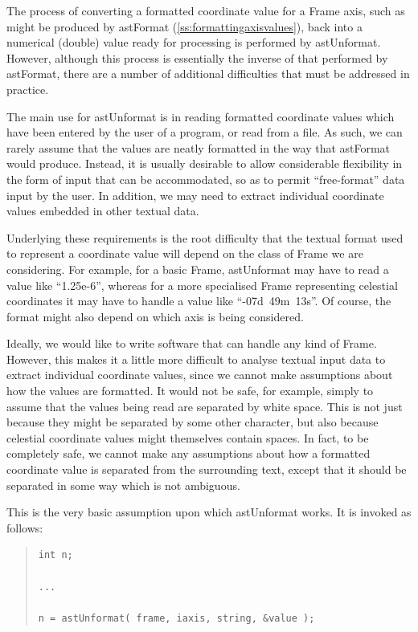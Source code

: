 \documentclass[twoside,11pt]{article}
\newcommand{\htmlref}[2]{#1}
\newcommand{\secref}[1]{\S\ref{#1}}
\renewcommand{\secref}[1]{\ref{#1}}
\begin{document}
The process of converting a formatted coordinate value for a \htmlref{Frame}{Frame}
axis, such as might be produced by \htmlref{astFormat}{astFormat}
(\secref{ss:formattingaxisvalues}), back into a numerical (double)
value ready for processing is performed by \htmlref{astUnformat}{astUnformat}.  However,
although this process is essentially the inverse of that performed by
astFormat, there are a number of additional difficulties that must be
addressed in practice.

The main use for astUnformat is in reading formatted coordinate values
which have been entered by the user of a program, or read from a
file. As such, we can rarely assume that the values are neatly
formatted in the way that astFormat would produce. Instead, it is
usually desirable to allow considerable flexibility in the form of
input that can be accommodated, so as to permit ``free-format'' data
input by the user. In addition, we may need to extract individual
coordinate values embedded in other textual data.

Underlying these requirements is the root difficulty that the textual
format used to represent a coordinate value will depend on the class
of Frame we are considering. For example, for a basic Frame,
astUnformat may have to read a value like ``1.25e-6'', whereas for a
more specialised Frame representing celestial coordinates it may have
to handle a value like ``-07d~49m~13s''. Of course, the format might
also depend on which axis is being considered.

Ideally, we would like to write software that can handle any kind of
Frame. However, this makes it a little more difficult to analyse
textual input data to extract individual coordinate values, since we
cannot make assumptions about how the values are formatted. It would
not be safe, for example, simply to assume that the values being read
are separated by white space. This is not just because they might be
separated by some other character, but also because celestial
coordinate values might themselves contain spaces. In fact, to be
completely safe, we cannot make any assumptions about how a formatted
coordinate value is separated from the surrounding text, except that
it should be separated in some way which is not ambiguous.

This is the very basic assumption upon which astUnformat works. It is
invoked as follows:

\begin{quote}
\small
\begin{verbatim}
int n;

...

n = astUnformat( frame, iaxis, string, &value );
\end{verbatim}
\normalsize
\end{quote}
\end{document}

